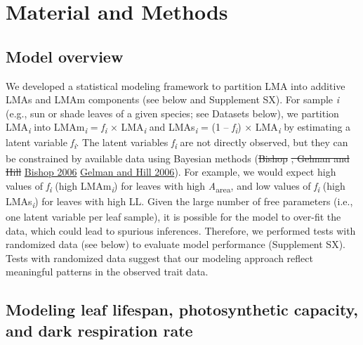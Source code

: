 \documentclass[
  12pt,
]{article}
\providecommand{\DIFaddtex}[1]{{\protect\color{blue}\uwave{#1}}} %
\providecommand{\DIFdeltex}[1]{{\protect\color{red}\sout{#1}}}                      %
\providecommand{\DIFaddbegin}{} %
\providecommand{\DIFaddend}{} %
\providecommand{\DIFdelbegin}{} %
\providecommand{\DIFdelend}{} %
\providecommand{\DIFadd}[1]{\texorpdfstring{\DIFaddtex{#1}}{#1}} %
\providecommand{\DIFdel}[1]{\texorpdfstring{\DIFdeltex{#1}}{}} %
\newcommand{\DIFscaledelfig}{0.5}
\newlength{\DIFdelgraphicswidth} %
\newlength{\DIFdelgraphicsheight} %
\newcommand{\DIFaddincludegraphics}[2][]{{\color{blue}\fbox{\DIFOincludegraphics[#1]{#2}}}} %
\newcommand{\DIFdelincludegraphics}[2][]{%
\sbox{\DIFdelgraphicsbox}{\DIFOincludegraphics[#1]{#2}}%
\settoboxwidth{\DIFdelgraphicswidth}{\DIFdelgraphicsbox} %
\settoboxtotalheight{\DIFdelgraphicsheight}{\DIFdelgraphicsbox} %
\scalebox{\DIFscaledelfig}{%
\parbox[b]{\DIFdelgraphicswidth}{\usebox{\DIFdelgraphicsbox}\\[-\baselineskip] \rule{\DIFdelgraphicswidth}{0em}}\llap{\resizebox{\DIFdelgraphicswidth}{\DIFdelgraphicsheight}{%
\setlength{\unitlength}{\DIFdelgraphicswidth}%
\begin{picture}(1,1)%
\thicklines\linethickness{2pt} %
{\color[rgb]{1,0,0}\put(0,0){\framebox(1,1){}}}%
{\color[rgb]{1,0,0}\put(0,0){\line( 1,1){1}}}%
{\color[rgb]{1,0,0}\put(0,1){\line(1,-1){1}}}%
\end{picture}%
}\hspace*{3pt}}} %
} %
\DeclareRobustCommand{\DIFaddbegin}{\DIFOaddbegin \let\includegraphics\DIFaddincludegraphics} %
\DeclareRobustCommand{\DIFaddend}{\DIFOaddend \let\includegraphics\DIFOincludegraphics} %
\DeclareRobustCommand{\DIFdelbegin}{\DIFOdelbegin \let\includegraphics\DIFdelincludegraphics} %
\DeclareRobustCommand{\DIFdelend}{\DIFOaddend \let\includegraphics\DIFOincludegraphics} %
\begin{document}
\hypertarget{material-and-methods}{%
\section{Material and Methods}\label{material-and-methods}}

\hypertarget{model-overview}{%
\subsection{Model overview}\label{model-overview}}

We developed a statistical modeling framework to partition LMA into additive LMAs and LMAm components (see below and Supplement SX).
For sample \emph{i} (e.g., sun or shade leaves of a given species; see Datasets below), we partition LMA\textsubscript{\emph{i}} into LMAm\textsubscript{\emph{i}} = \emph{f\textsubscript{i}} × LMA\textsubscript{\emph{i}} and LMAs\textsubscript{\emph{i}} = (1 -- \emph{f\textsubscript{i}}) × LMA\textsubscript{\emph{i}} by estimating a latent variable \emph{f\textsubscript{i}}.
The latent variables \emph{f\textsubscript{i}} are not directly observed, but they can be constrained by available data using Bayesian methods (\DIFdelbegin \DIFdel{Bishop }\DIFdelend \protect\DIFdelbegin %
\DIFdel{, Gelman and Hill }\DIFdelend \DIFaddbegin \hyperlink{ref-Bishop2006}{Bishop 2006}\DIFadd{, }\DIFaddend \protect\DIFdelbegin %
\DIFdelend \DIFaddbegin \hyperlink{ref-Gelman2006}{Gelman and Hill 2006}\DIFaddend ).
For example, we would expect high values of \emph{f\textsubscript{i}} (high LMAm\textsubscript{\emph{i}}) for leaves with high \emph{A}\textsubscript{area}, and low values of \emph{f\textsubscript{i}} (high LMAs\textsubscript{\emph{i}}) for leaves with high LL.
Given the large number of free parameters (i.e., one latent variable per leaf sample), it is possible for the model to over-fit the data, which could lead to spurious inferences.
Therefore, we performed tests with randomized data (see below) to evaluate model performance (Supplement SX).
Tests with randomized data suggest that our modeling approach reflect meaningful patterns in the observed trait data.

\hypertarget{modeling-leaf-lifespan-photosynthetic-capacity-and-dark-respiration-rate}{%
\subsection{Modeling leaf lifespan, photosynthetic capacity, and dark respiration rate}\label{modeling-leaf-lifespan-photosynthetic-capacity-and-dark-respiration-rate}}
\end{document}
